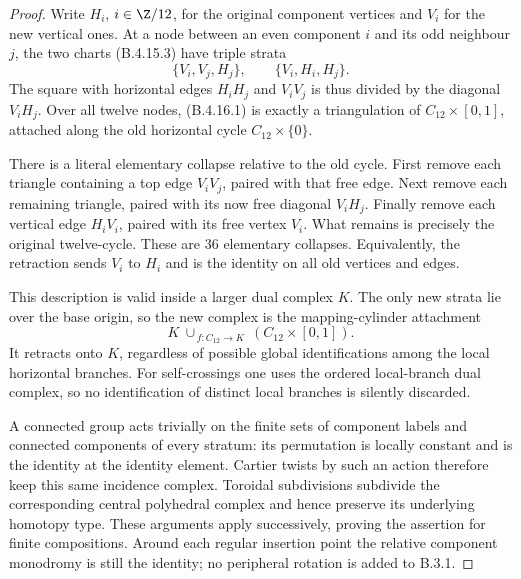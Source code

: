 \begin{proof}
Write $H_i$, $i\in\Z/12$, for the original component
vertices and $V_i$ for the new vertical ones. At a node
between an even component $i$ and its odd neighbour
$j$, the two charts (B.4.15.3) have triple strata
\[
 \{V_i,V_j,H_j\},\qquad
 \{V_i,H_i,H_j\}.
 \tag{B.4.16.1}
\]
The square with horizontal edges $H_iH_j$ and $V_iV_j$
is thus divided by the diagonal $V_iH_j$. Over all
twelve nodes, (B.4.16.1) is exactly a triangulation of
$C_{12}\times[0,1]$, attached along the old horizontal
cycle $C_{12}\times\{0\}$.

There is a literal elementary collapse relative to the
old cycle. First remove each triangle containing a top
edge $V_iV_j$, paired with that free edge. Next remove
each remaining triangle, paired with its now free
diagonal $V_iH_j$. Finally remove each vertical edge
$H_iV_i$, paired with its free vertex $V_i$. What remains
is precisely the original twelve-cycle. These are
$36$ elementary collapses. Equivalently, the retraction
sends $V_i$ to $H_i$ and is the identity on all old
vertices and edges.

This description is valid inside a larger dual complex
$K$. The only new strata lie over the base origin,
so the new complex is the mapping-cylinder attachment
\[
 K\ \cup_{\,f:C_{12}\to K}\
           (C_{12}\times[0,1]).
\]
It retracts onto $K$, regardless of possible global
identifications among the local horizontal branches.
For self-crossings one uses the ordered local-branch
dual complex, so no identification of distinct local
branches is silently discarded.

A connected group acts trivially on the finite sets
of component labels and connected components of every
stratum: its permutation is locally constant and is
the identity at the identity element. Cartier twists
by such an action therefore keep this same incidence
complex. Toroidal subdivisions subdivide the
corresponding central polyhedral complex and hence
preserve its underlying homotopy type. These arguments
apply successively, proving the assertion for finite
compositions. Around each regular insertion point the
relative component monodromy is still the identity;
no peripheral rotation is added to B.3.1.


\end{proof}
